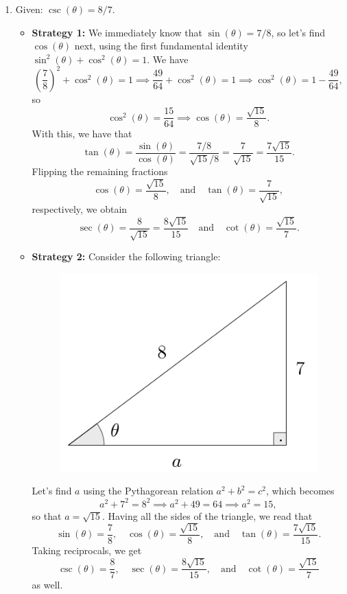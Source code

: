 \documentclass{ximera}
\begin{document}
\begin{example}
\begin{enumerate}[label=\alph*.]
  \item Given: $\csc(\theta) = 8/7$.

    \begin{explanation}
      \begin{itemize}
      \item {\bf Strategy 1:} We immediately know that $\sin(\theta) = 7/8$, so let's find $\cos(\theta)$ next, using the first fundamental identity $\sin^2(\theta)+\cos^2(\theta)=1$. We have $$\left(\frac{7}{8}\right)^2+\cos^2(\theta)=1 \implies \frac{49}{64}+\cos^2(\theta)=1 \implies \cos^2(\theta) = 1-\frac{49}{64},$$so $$\cos^2(\theta) = \frac{15}{64} \implies \cos(\theta) = \frac{\sqrt{15}}{8}.$$ With this, we have that \[   \tan(\theta) = \frac{\sin(\theta)}{\cos(\theta)} = \frac{7/8}{\sqrt{15}/8} = \frac{7}{\sqrt{15}} = \frac{7\sqrt{15}}{15}.  \]Flipping the remaining fractions $$\cos(\theta) = \frac{\sqrt{15}}{8}, \quad\mbox{and}\quad \tan(\theta) = \frac{7}{\sqrt{15}},$$respectively, we obtain $$\sec(\theta) = \frac{8}{\sqrt{15}} =\frac{8\sqrt{15}}{15} \quad\mbox{and}\quad \cot(\theta) =\frac{\sqrt{15}}{7}.$$
      \item {\bf Strategy 2:} Consider the following triangle: \begin{figure}[h]
          \centering
          \includegraphics[scale=.3]{./figures/9-1-3-triangle-csc-8-7.png}
        \end{figure}Let's find $a$ using the Pythagorean relation $a^2+b^2=c^2$, which becomes $$a^2+7^2=8^2\implies a^2+49=64\implies a^2 = 15,$$so that $a=\sqrt{15}$. Having all the sides of the triangle, we read that $$\sin(\theta)=\frac{7}{8},\quad\cos(\theta)=\frac{\sqrt{15}}{8},\quad\mbox{and}\quad\tan(\theta)=\frac{7\sqrt{15}}{15}.$$Taking reciprocals, we get $$\csc(\theta)=\frac{8}{7},\quad\sec(\theta)=\frac{8\sqrt{15}}{15},\quad\mbox{and}\quad\cot(\theta)=\frac{\sqrt{15}}{7}$$ as well.
      \end{itemize}
    \end{explanation}
    

\end{enumerate}
\end{example}
\end{document}
